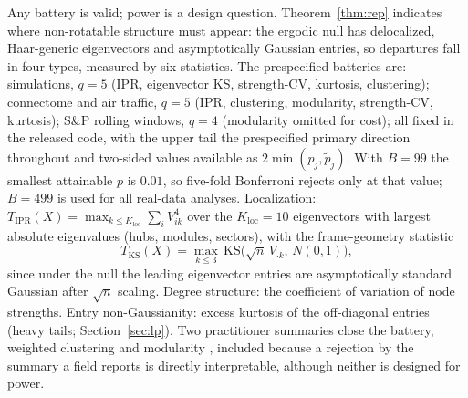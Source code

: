 Any battery is valid; power is a design question. Theorem~\ref{thm:rep}
indicates where non-rotatable structure must appear: the ergodic null has
delocalized, Haar-generic eigenvectors and asymptotically Gaussian entries,
so departures fall in four types, measured by six statistics. The
prespecified batteries are: simulations, $q=5$ (IPR, eigenvector KS,
strength-CV, kurtosis, clustering); connectome and air traffic, $q=5$
(IPR, clustering, modularity, strength-CV, kurtosis); S\&P rolling
windows, $q=4$ (modularity omitted for cost); all fixed in the
released code, with the upper tail the prespecified primary direction
throughout and two-sided values available as
$2\min(p_j,\tilde p_j)$. With $B=99$ the smallest attainable $p$ is
$0.01$, so five-fold Bonferroni rejects only at that value; $B=499$ is
used for all real-data analyses. Localization: $T_{\mathrm{IPR}}(X)=\max_{k\le
K_{\mathrm{loc}}}\sum_i V_{ik}^4$ over the $K_{\mathrm{loc}}=10$
eigenvectors with largest absolute eigenvalues (hubs, modules,
sectors), with the frame-geometry statistic
\[
T_{\mathrm{KS}}(X)=\max_{k\le3}\,
\mathrm{KS}\bigl(\sqrt n\,V_{\cdot k},\,N(0,1)\bigr),
\]
since under the null the leading eigenvector entries are
asymptotically standard Gaussian after $\sqrt n$ scaling. Degree
structure: the coefficient of variation of node strengths. Entry
non-Gaussianity: excess kurtosis of the off-diagonal entries (heavy
tails; Section~\ref{sec:lp}). Two practitioner summaries close the
battery, weighted clustering \citep{onnela2005intensity} and
modularity \citep{newman2006}, included because a rejection by the
summary a field reports is directly interpretable, although neither is
designed for power.

